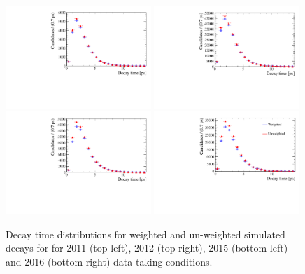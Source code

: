 \begin{figure}[htbp]
  \centering
    \includegraphics[width=0.49\textwidth]{./Figs/LifetimeMeasurement/2011_decaytime_Bd2KPi_weighting_impact.pdf}
    \includegraphics[width=0.49\textwidth]{./Figs/LifetimeMeasurement/2012_decaytime_Bd2KPi_weighting_impact.pdf}
    \includegraphics[width=0.49\textwidth]{./Figs/LifetimeMeasurement/2015_decaytime_Bd2KPi_weighting_impact.pdf}
    \includegraphics[width=0.49\textwidth]{./Figs/LifetimeMeasurement/2016_decaytime_Bd2KPi_weighting_impact.pdf}
  \caption{Decay time distributions for weighted and un-weighted \bdkpi simulated decays for for 2011 (top left), 2012 (top right), 2015 (bottom left) and 2016 (bottom right) data taking conditions.}
  \label{fig:BdToKpi_weightDecayTime}
\end{figure}


